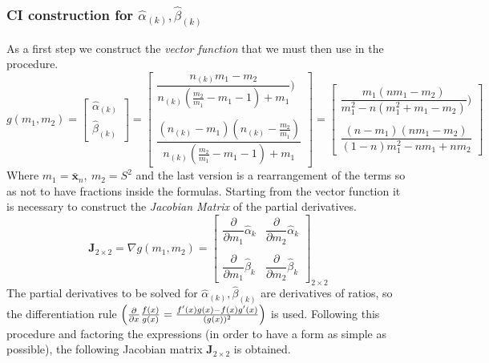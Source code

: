 \documentclass[10pt]{article} %
\begin{document}
\subsubsection{CI construction for $\hat{\alpha}_{(k)}, \hat{\beta}_{(k)}$}
As a first step we construct the \textit{vector function} that we must then use in the procedure.
\begin{equation}
    g(m_{1}, m_{2}) = 
    \begin{bmatrix}
        \hat{\alpha}_{(k)}\\
        \hat{\beta}_{(k)}
    \end{bmatrix}
    =
    \begin{bmatrix}
        \dfrac{n_{(k)}m_{1}-m_{2}}{n_{(k)}(\frac{m_{2}}{m_{1}}-{m_{1}} -1)+m_{1}})\\\\
        \dfrac{(n_{(k)}-m_{1})(n_{(k)}-\frac{m_{2}}{m_{1}})}{n_{(k)}(\frac{m_{2}}{m_{1}}-m_{1} -1)+m_{1}}
    \end{bmatrix} 
    =
    \begin{bmatrix}
        \dfrac{m_{1}(nm_{1}-m_{2})}{m_{1}^{2}-n(m_{1}^{2}+m_{1}-m_{2})})\\\\
        \dfrac{(n-m_{1})(nm_{1}-m_{2})}{(1-n)m_{1}^{2} - nm_{1} + nm_{2}}
    \end{bmatrix}
\end{equation}
Where $m_{1}=\bar{\mathbf{x}}_{n},\ m_{2}=S^{2}$ and the last version is a rearrangement of the terms so as not to have fractions inside the formulas.
Starting from the vector function it is necessary to construct the \textit{Jacobian Matrix} of the partial derivatives.
\begin{equation}
    \mathbf{J}_{2\times2} = \nabla g(m_{1}, m_{2}) = 
    \begin{bmatrix}
        \dfrac{\partial}{\partial m_{1}}\hat{\alpha}_{k} & \dfrac{\partial}{\partial m_{2}}\hat{\alpha}_{k}\\ \\
        \dfrac{\partial}{\partial m_{1}}\hat{\beta}_{k} & \dfrac{\partial}{\partial m_{2}}\hat{\beta}_{k}
    \end{bmatrix}_{2\times2}
\end{equation}
The partial derivatives to be solved for $\hat{\alpha}_{(k)}, \hat{\beta}_{(k)}$ are derivatives of ratios, so the differentiation rule $\Bigl(\frac{\partial}{\partial x}\frac{f(x)}{g(x)} = \frac{f'(x)g(x)-f(x)g'(x)}{(g(x))^{2}} \Bigr)$ is used. Following this procedure and factoring the expressions (in order to have a form as simple as possible), the following Jacobian matrix $\mathbf{J}_{2\times2}$ is obtained. 
\end{document}
